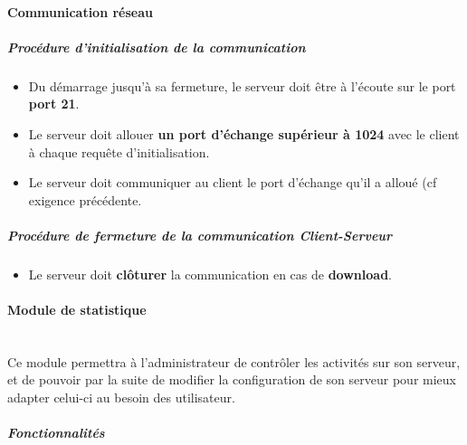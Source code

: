 \documentclass[10pt,a4paper]{report}
\begin{document}
\paragraph{Communication réseau}

	\subparagraph{Procédure d'initialisation de la communication}

		\begin{itemize}[label = $\triangleright$]
			\item  Du démarrage jusqu'à sa fermeture, le serveur doit être à l'écoute sur le port \textbf{port 21}.

			\item Le serveur doit allouer \textbf{un port d'échange supérieur à 1024} avec le client à chaque requête d'initialisation.

			\item Le serveur doit communiquer au client le port d'échange qu'il a alloué (cf exigence précédente.

		\end{itemize}
		
\subparagraph{Procédure de fermeture de la communication Client-Serveur}

	\begin{itemize}[label = $\triangleright$]
		\item Le serveur doit \textbf{clôturer} la communication en cas de \textbf{download}. 
	\end{itemize}
	
\paragraph{Module de statistique \\ \\}

	Ce module permettra à l'administrateur de contrôler les activités sur son serveur, et 	de pouvoir par la suite de modifier la configuration de son serveur pour mieux adapter celui-ci au besoin des utilisateur.

	\subparagraph{Fonctionnalités}
\end{document}
